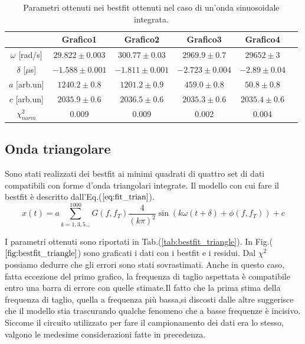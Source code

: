 \documentclass{article}
\begin{document}
            \begin{table}[H]
                \centering
                \begin{tabular}{cccccc}
                    \hline
                               & Grafico1              &Grafico2               & Grafico3                &Grafico4 \\
                    \hline
                    $\omega$ [rad/s]    & $29.822\pm 0.003$     & $300.77 \pm 0.03$     & $2969.9\pm 0.7$         & $29652  \pm 3$ \\
                    $\delta$ [$\mu$s]   & $-1.588 \pm 0.001$    & $-1.811 \pm 0.001$    & $-2.723\pm 0.004$       & $-2.89 \pm 0.04$ \\
                    $a$ [arb.un]          & $1240.2\pm 0.8$       & $1201.2\pm 0.9$        & $459.0 \pm 0.8$         & $50.8 \pm 0.8$ \\
                    $c$ [arb.un]          & $2035.9 \pm 0.6$      & $2036.5 \pm 0.6$      & $2035.3 \pm 0.6$        & $2035.4 \pm 0.6$ \\
                    $\chi^{2}_{norm}$   & 0.009                 & 0.009                 & 0.002                   & 0.004 \\
                    \hline
                \end{tabular}
                \caption{Parametri ottenuti nei bestfit ottenuti nel caso di un'onda sinuosoidale integrata.}
                \label{tab:bestfit_sinusoid}
            \end{table}

    \subsection{Onda triangolare}
        \label{sez:bestfit_trian}
        Sono stati realizzati dei bestfit ai minimi quadrati
        di quattro set di dati compatibili con forme d'onda triangolari integrate.
         Il modello con cui fare il bestfit è descritto dall'Eq.($\ref{eq:fit_trian}$).
            \begin{equation}
                x(t) = a\sum_{k=1,3,5...}^{1000} G(f,f_T)\frac{4}{(k\pi)^2}\sin\left(k\omega (t+\delta)+\phi(f,f_T)\right) +c
                \label{eq:fit_trian}
            \end{equation} 

        I parametri ottenuti sono riportati in Tab.(\ref{tab:bestfit_triangle}).%
        In Fig.($\ref{fig:bestfit_triangle}$) sono graficati i dati con i bestfit e 
        i residui. Dal $\chi^2$ possiamo dedurre che gli errori sono stati sovrastimati.
        Anche in questo caso, fatta eccezione del primo grafico, la frequenza di taglio aspettata 
        è compatibile entro una  barra di errore con quelle stimate.Il fatto che la prima stima  della
        frequenza  di taglio, quella a frequenza più bassa,si discosti dalle altre suggerisce
        che il modello stia trascurando qualche fenomeno che a basse frequenze è incisivo.
        Siccome il circuito utilizzato per fare il campionamento dei dati era lo stesso, valgono le medesime considerazioni fatte in precedenza.
       
\end{document}
